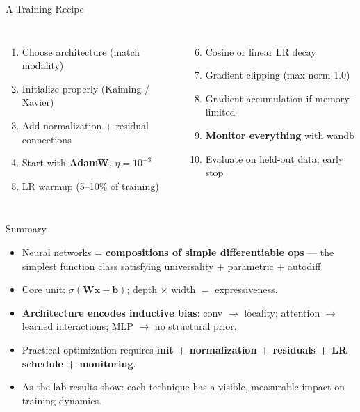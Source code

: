 \documentclass[aspectratio=169, 10pt]{beamer}
\newcommand{\bx}{\bm{x}}
\newcommand{\bW}{\bm{W}}
\newcommand{\bb}{\bm{b}}
\begin{document}
\begin{frame}{A Training Recipe}

\begin{columns}[T]
\begin{enumerate}
  \item Choose architecture (match modality)
  \item Initialize properly (Kaiming / Xavier)
  \item Add normalization + residual connections
  \item Start with \textbf{AdamW}, $\eta=10^{-3}$
  \item LR warmup (5--10\% of training)
\end{enumerate}

\begin{enumerate}\setcounter{enumi}{5}
  \item Cosine or linear LR decay
  \item Gradient clipping (max norm 1.0)
  \item Gradient accumulation if memory-limited
  \item \textbf{Monitor everything} with wandb
  \item Evaluate on held-out data; early stop
\end{enumerate}
\end{columns}

\end{frame}

\begin{frame}{Summary}

\begin{itemize}
  \item<1-> Neural networks = \textbf{compositions of simple differentiable ops} --- the simplest function class satisfying universality + parametric + autodiff.
  \item<2-> Core unit: $\sigma(\bW\bx + \bb)$; depth $\times$ width $=$ expressiveness.
  \item<3-> \textbf{Architecture encodes inductive bias}: conv $\to$ locality; attention $\to$ learned interactions; MLP $\to$ no structural prior.
  \item<4-> Practical optimization requires \textbf{init + normalization + residuals + LR schedule + monitoring}.
  \item<5-> As the lab results show: each technique has a visible, measurable impact on training dynamics.
\end{itemize}


\end{frame}
\end{document}
